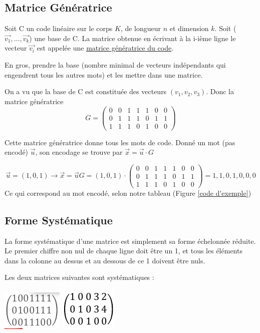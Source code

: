 \documentclass[11pt,a4paper]{article}
\renewcommand{\)}{\right)}
\renewcommand{\(}{\left(}
\begin{document}
\subsection{Matrice Génératrice}
 Soit C un code linéaire sur le corps $K$, de longueur $n$ et dimension $k$. Soit ($\vec{v_1},\ldots,\vec{v_k}$) une base de C. La matrice obtenue en écrivant à la i-ième ligne le vecteur $\vec{v_i}$ est appelée une \uline{matrice génératrice du code}.

En gros, prendre la base (nombre minimal de vecteurs indépendants qui engendrent tous les autres mots) et les mettre dans une matrice.
\begin{exemple}
	On a vu que la base de C est constituée des vecteurs $(v_1,v_2,v_3)$. Donc la matrice génératrice 
	\[G = 
	\begin{pmatrix}
		0&0&1&1&1&0&0\\
		0&1&1&1&0&1&1\\
		1&1&1&0&1&0&0
	\end{pmatrix}
	\]
\end{exemple}
Cette matrice génératrice donne tous les mots de code. Donné un mot (pas encodé) $\vec{u}$, son encodage se trouve par $\vec{x} = \vec{u}\cdot G$
\begin{exemple}
	\[\vec{u} = (1,0,1) \to \vec{x} = \vec{u}G = (1,0,1)\cdot
	\begin{pmatrix}
		0&0&1&1&1&0&0\\
		0&1&1&1&0&1&1\\
		1&1&1&0&1&0&0
	\end{pmatrix}
	= 1,1,0,1,0,0,0\]
	Ce qui correspond au mot encodé, selon notre tableau (Figure \ref{code d'exemple})
\end{exemple}

\subsection{Forme Systématique}
\label{systematique}
La forme systématique d'une matrice est simplement sa forme échelonnée réduite. Le premier chiffre non nul de chaque ligne doit être un 1, et tous les éléments dans la colonne au dessus et au dessous de ce 1 doivent être nuls.

\begin{exemple}[0.5]
	Les deux matrices suivantes sont systématiques :
	\begin{center}
		\includegraphics[scale=0.6]{images/g1}
		\includegraphics[scale=0.6]{images/g3}
	\end{center}	
\end{exemple}
\end{document}

